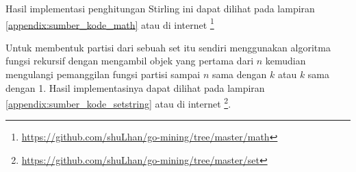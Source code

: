 Hasil implementasi penghitungan Stirling ini dapat dilihat pada lampiran \ref{appendix:sumber_kode_math} atau di internet \footnote{\url{https://github.com/shuLhan/go-mining/tree/master/math}}

Untuk membentuk partisi dari sebuah set itu sendiri menggunakan algoritma fungsi rekursif dengan mengambil objek yang pertama dari $n$ kemudian mengulangi pemanggilan fungsi partisi sampai $n$ sama dengan $k$ atau $k$ sama dengan 1. Hasil implementasinya dapat dilihat pada lampiran \ref{appendix:sumber_kode_setstring} atau di internet
\footnote{\url{https://github.com/shuLhan/go-mining/tree/master/set}}.
